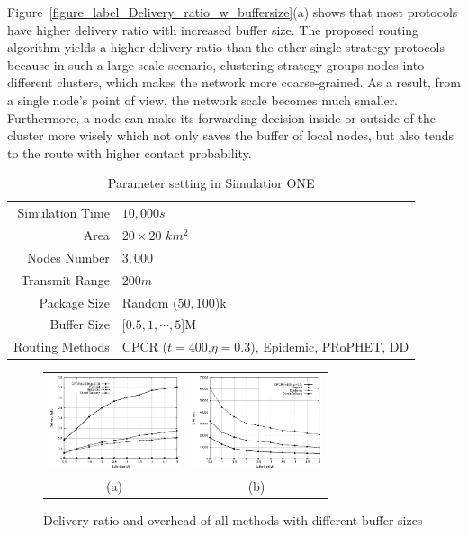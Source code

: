 \documentclass[conference]{IEEEtran}
\begin{document}
Figure~\ref{figure_label_Delivery_ratio_w_buffersize}(a) shows that most protocols have higher delivery ratio with increased buffer size. The proposed routing algorithm yields a higher delivery ratio than the other single-strategy protocols because in such a large-scale scenario, clustering strategy groups nodes into different clusters, which makes the network more coarse-grained. As a result, from a single node's point of view, the network scale becomes much smaller. Furthermore, a node can make its forwarding decision inside or outside of the cluster more wisely which not only saves the buffer of local nodes, but also tends to the route with higher contact probability.

\begin{table}[!t]
  \centering
  \caption{Parameter setting in Simulatior ONE}\label{table_label_parameter_setting_in_ONE}
\vspace{0.1in}
  \begin{tabular}[c]{r|l}
  \hline
  Simulation Time & $10,000s$ \\
  Area & $20\times 20$ $km^{2}$ \\
  Nodes Number & $3,000$ \\
  Transmit Range& $200m$ \\
  Package Size & Random ($50,100$)k \\
  Buffer Size & [$0.5,1,\cdots,5$]M \\
  Routing Methods & CPCR ($t=400$,$\eta =0.3$), Epidemic, PRoPHET, DD \\
  \hline
  \end{tabular}
\end{table}

\begin{figure}
\centering
\begin{tabular}{cc}
  \includegraphics[width=1.5in]{figures_1/performance_deliveryrate.eps} &
   \includegraphics[width=1.5in]{figures_1/performance_overhead.eps}\\
   (a) & (b)
   \end{tabular}
  \caption{Delivery ratio and overhead of all methods with different buffer sizes}\label{figure_label_Delivery_ratio_w_buffersize}\label{figure_label_Overhead_w_buffer_sizes}
\end{figure}
\end{document}
